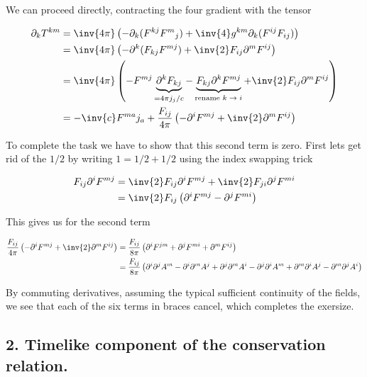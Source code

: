 We can proceed directly, contracting the four gradient with the tensor

\begin{align*}
\partial_k T^{k m} 
&=
\inv{4 \pi} \left( 
-\partial_k( F^{k j} {F^{m}}_j ) 
+ \inv{4} g^{k m} \partial_k 
(F^{i j} F_{i j}) 
\right) \\
&=
\inv{4 \pi} \left( 
-\partial^k( F_{k j} F^{m j} ) + \inv{2} F_{i j} \partial^m F^{i j} 
\right) \\
&=
\inv{4 \pi} \left( 
-F^{m j} \underbrace{\partial^k F_{k j} }_{= 4 \pi j_j/c}
-\underbrace{F_{k j} \partial^k F^{m j} }_{\text{rename $k \rightarrow i$}}
+ \inv{2} F_{i j} \partial^m F^{i j} 
\right) \\
&=
- \inv{c} F^{m a} j_a
+\frac{F_{i j}}{4 \pi} \left( 
-\partial^i F^{m j} + \inv{2} \partial^m F^{i j} 
\right) \\
\end{align*}

To complete the task we have to show that this second term is zero.  First lets get rid of the $1/2$ by writing $1 = 1/2 + 1/2$ using the index swapping trick

\begin{align*}
F_{i j} \partial^i F^{m j} 
&= 
\inv{2} F_{i j} \partial^i F^{m j} + \inv{2} F_{j i} \partial^j F^{m i} \\
&= 
\inv{2} F_{i j} \left( \partial^i F^{m j} - \partial^j F^{m i} \right)
\end{align*}

This gives us for the second term

\begin{align*}
\frac{F_{i j}}{4 \pi} \left( -\partial^i F^{m j} + \inv{2} \partial^m F^{i j} \right) 
&=
\frac{F_{i j}}{8 \pi} \left( \partial^i F^{j m} + \partial^j F^{m i} + \partial^m F^{i j} \right) \\
&=
\frac{F_{i j}}{8 \pi} \left( 
\partial^i \partial^j A^m
-\partial^i \partial^m A^j
+\partial^j \partial^m A^i
-\partial^j \partial^i A^m
+\partial^m \partial^i A^j
-\partial^m \partial^j A^i
\right) \\
\end{align*}

By commuting derivatives, assuming the typical sufficient continuity of the fields, we see that each of the six terms in braces cancel, which completes the exersize.

\subsection{2. Timelike component of the conservation relation.}

